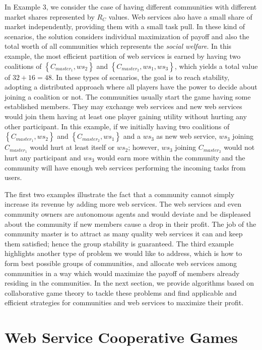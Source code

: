 \documentclass[10pt,journal,cspaper,compsoc]{IEEEtran}
\begin{document}
In Example 3, we consider the case of having different communities
with different market shares represented by ${R_C}$ values. Web
services also have a small share of market independently,
providing them with a small task pull. In these kind of scenarios,
the solution considers individual maximization of payoff and also
the total worth of all communities which represents the
\emph{social welfare}. In this example, the most efficient
partition of web services is earned by having two coalitions of
$\left\{C_{master_1}, ws_2\right\}$ and $\left\{C_{master_2},
ws_1, ws_3\right\}$, which yields a total value of $32 + 16 = 48$.
In these types of scenarios, the goal is to reach stability,
adopting a distributed approach where all players have the power
to decide about joining a coalition or not. The communities
usually start the game having some established members. They may
exchange web services and new web services would join them having
at least one player gaining utility without hurting any other
participant. In this example, if we initially having two
coalitions of $\left\{C_{master_1}, ws_2\right\}$ and
$\left\{C_{master_2}, ws_1\right\}$ and a ${ws_3}$ as new web
service, ${ws_3}$ joining ${C_{master_1}}$ would hurt at least
itself or $ws_2$; however, ${ws_3}$ joining ${C_{master_2}}$ would
not hurt any participant and ${ws_3}$ would earn more within the
community and the community will have enough web services
performing the incoming tasks from users.

The first two examples illustrate the fact that a community cannot
simply increase its revenue by adding more web services. The web
services and even community owners are autonomous agents and would
deviate and be displeased about the community if new members cause
a drop in their profit. The job of the community master is to
attract as many quality web services it can and keep them
satisfied; hence the group stability is guaranteed. The third
example highlights another type of problem we would like to
address, which is how to form best possible groups of communities,
and allocate web services among communities in a way which would
maximize the payoff of members already residing in the
communities. In the next section, we provide algorithms based on
collaborative game theory to tackle these problems and find
applicable and efficient strategies for communities and web
services to maximize their profit.


\section{Web Service Cooperative Games}\label{s:game_solution}
\end{document}
